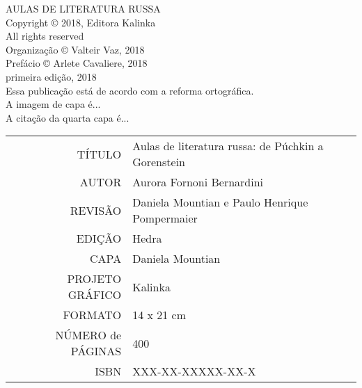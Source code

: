 \newpage
\pagestyle{empty}
\MyriadPro
\scriptsize
\begin{center}
AULAS DE LITERATURA RUSSA\\[6pt]

Copyright © 2018, Editora Kalinka\\[6pt]

All rights reserved\\[20pt]

Organização © Valteir Vaz, 2018\\[6pt]

Prefácio © Arlete Cavaliere, 2018\\[6pt]

primeira edição, 2018\\[40pt]


Essa publicação está de acordo com a reforma ortográfica.\\[6pt]
A imagem de capa é...\\[6pt]	
A citação da quarta capa é...\\[20pt] 
\end{center}


\bigskip

\begin{vplace}[1]
\begin{table}[ht!]
\MyriadPro
\scriptsize
\begin{tabular}{rl}
TÍTULO            & Aulas de literatura russa: de Púchkin a Gorenstein \\[2pt]
AUTOR             & Aurora Fornoni Bernardini                          \\[2pt]
REVISÃO           & Daniela Mountian e Paulo Henrique Pompermaier      \\[2pt]
EDIÇÃO            & Hedra                                              \\[2pt]
CAPA              & Daniela Mountian                                   \\[2pt]
PROJETO GRÁFICO   & Kalinka                                            \\[2pt]
FORMATO           & 14 x 21 cm                                         \\[2pt]
NÚMERO de PÁGINAS & 400                                                \\[2pt]
ISBN              & XXX-XX-XXXXX-XX-X                                 
\end{tabular}
\end{table}
\end{vplace}

